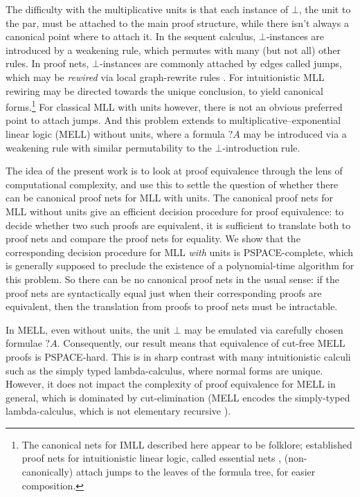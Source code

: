 \documentclass{lmcs}
\let\capsabbrev=\uppercase
\begin{document}
The difficulty with the multiplicative units is that each instance of $\bot$, the unit to the par, must be attached to the main proof structure, while there isn't always a canonical point where to attach it. In the sequent calculus, $\bot$-instances are introduced by a weakening rule, which permutes with many (but not all) other rules. In proof nets, $\bot$-instances are commonly attached by edges called jumps, which may be \emph{rewired} via local graph-rewrite rules \cite{Trimble-1994,Blute-Cockett-Seely-Trimble-1996}. For intuitionistic \capsabbrev{mll} rewiring may be directed towards the unique conclusion, to yield canonical forms.\footnote{The canonical nets for \capsabbrev{imll} described here appear to be folklore; established proof nets for intuitionistic linear logic, called essential nets \cite{Lamarche-2008,Murawski-Ong-2003}, (non-canonically) attach jumps to the leaves of the formula tree, for easier composition.}
For classical MLL with units however, there is not an obvious preferred point to attach jumps. And this problem extends to multiplicative--exponential linear logic (\capsabbrev{mell}) without units, where a formula $?A$ may be introduced via a weakening rule with similar permutability to the $\bot$-introduction rule.


The idea of the present work is to look at proof equivalence through the lens of computational
complexity, and use this to settle the question of whether there can be canonical proof nets
for \capsabbrev{mll} with units. The canonical proof nets for \capsabbrev{mll} without units
give an efficient decision procedure for proof equivalence: to decide whether two such proofs
are equivalent, it is sufficient to translate both to proof nets and compare the proof nets
for equality.
%
We show that the corresponding decision procedure for \capsabbrev{mll} \emph{with} units is
\capsabbrev{pspace}-complete, which is generally supposed to preclude the existence of a
polynomial-time algorithm for this problem. So there can be no canonical proof nets in the
usual sense: if the proof nets are syntactically equal just when their corresponding proofs
are equivalent, then the translation from proofs to proof nets must be intractable.



In \capsabbrev{mell}, even without units, the unit $\bot$ may be emulated via carefully chosen formulae $?A$. Consequently, our result means that equivalence of cut-free MELL proofs is \capsabbrev{pspace}-hard. This is in sharp contrast with many intuitionistic calculi such as the simply typed lambda-calculus, where normal forms are unique. However, it does not impact the complexity of proof equivalence for \capsabbrev{mell} in general, which is dominated by cut-elimination (\capsabbrev{mell} encodes the simply-typed lambda-calculus, which is not elementary recursive \cite{Statman-1977}).
\end{document}
